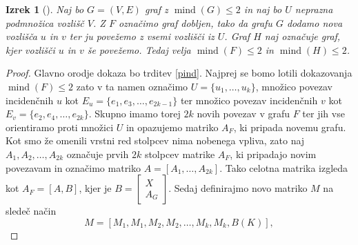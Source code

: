 \documentclass[12pt,a4paper,twoside]{article}
\theoremstyle{definition} %
\theoremstyle{plain} %
\newtheorem{izrek}[definicija]{Izrek}
\numberwithin{equation}{section}  %
\DeclareMathOperator{\mind}{mind}
\begin{document}
\begin{izrek}[\citet{alg_org}]
\label{algcons}
Naj bo $G = (V, E)$ graf z $\mind(G) \le 2$ in naj bo $U$ neprazna podmnožica vozlišč $V$. Z $F$ označimo graf dobljen, tako da grafu $G$ dodamo nova vozlišča $u$ in $v$ ter ju povežemo z vsemi vozlišči iz $U$. Graf $H$ naj označuje graf, kjer vozlišči $u$ in $v$ še povežemo. Tedaj velja $\mind(F) \le 2$ in $\mind(H) \le 2$.
\end{izrek}

 \begin{proof}
Glavno orodje dokaza bo trditev \ref{pind}. Najprej se bomo lotili dokazovanja $\mind(F) \le 2$ zato v ta namen označimo $U = \{u_1, \ldots, u_k\}$, množico povezav incidenčnih $u$ kot $E_u = \{e_1, e_3, \ldots, e_{2k - 1}\}$ ter množico povezav incidenčnih $v$ kot $E_v = \{e_2, e_4, \ldots,e_{2k}\}$. Skupno imamo torej $2k$ novih povezav v grafu $F$ ter jih vse orientiramo proti množici $U$ in opazujemo matriko $A_F$, ki pripada novemu grafu. Kot smo že omenili vrstni red stolpcev nima nobenega vpliva, zato naj $A_1, A_2, \ldots, A_{2k}$ označuje prvih $2k$ stolpcev matrike $A_F$, ki pripadajo novim povezavam in označimo matriko $A = [A_1, \ldots, A_{2k}]$. Tako celotna matrika izgleda kot $A_F =[A, B] $, kjer je $ B =\begin{bmatrix}X \\A_G \end{bmatrix}  $. Sedaj definirajmo novo matriko $M$ na sledeč način
$$ M = [M_1, M_1, M_2, M_2, \ldots, M_k, M_k, B(K)], $$

\end{proof}
\end{document}
